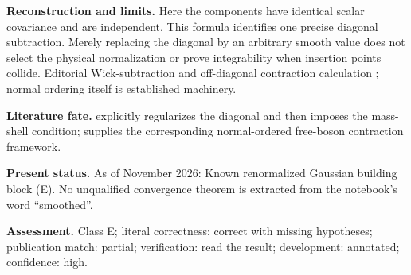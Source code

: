\noindent\textbf{Reconstruction and limits.} Here the components have identical scalar covariance and are independent. This formula identifies one precise diagonal subtraction. Merely replacing the diagonal by an arbitrary smooth value does not select the physical normalization or prove integrability when insertion points collide. Editorial Wick-subtraction and off-diagonal contraction calculation \oursComputed; normal ordering itself is established machinery.\par

\noindent\textbf{Literature fate.} \citet[\S6, between (6.24) and (6.26)]{belavinknizhnik1986complex} explicitly regularizes the diagonal and then imposes the mass-shell condition; \citet[\S3]{dotsenkofateev1984conformal} supplies the corresponding normal-ordered free-boson contraction framework.\par

\noindent\textbf{Present status.} As of November 2026: Known renormalized Gaussian building block (E). No unqualified convergence theorem is extracted from the notebook's word ``smoothed''.\par

\noindent\textbf{Assessment.} Class E; literal correctness: correct with missing hypotheses; publication match: partial; verification: read the result; development: annotated; confidence: high.\par

